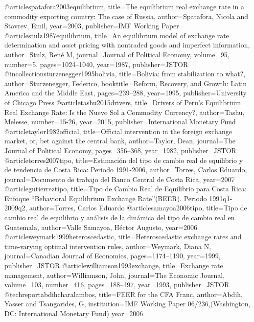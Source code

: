@article{spatafora2003equilibrium,
  title={The equilibrium real exchange rate in a commodity exporting country: The case of Russia},
  author={Spatafora, Nicola and Stavrev, Emil},
  year={2003},
  publisher={IMF Working Paper}
}
@article{stulz1987equilibrium,
  title={An equilibrium model of exchange rate determination and asset pricing with nontraded goods and imperfect information},
  author={Stulz, Ren{\'e} M},
  journal={Journal of Political Economy},
  volume={95},
  number={5},
  pages={1024--1040},
  year={1987},
  publisher={JSTOR}
}
@incollection{sturzenegger1995bolivia,
  title={Bolivia: from stabilization to what?},
  author={Sturzenegger, Federico},
  booktitle={Reform, Recovery, and Growth: Latin America and the Middle East},
  pages={239--288},
  year={1995},
  publisher={University of Chicago Press}
}
@article{tashu2015drivers,
  title={Drivers of Peru's Equilibrium Real Exchange Rate: Is the Nuevo Sol a Commodity Currency?},
  author={Tashu, Melesse},
  number={15-26},
  year={2015},
  publisher={International Monetary Fund}
}
@article{taylor1982official,
  title={Official intervention in the foreign exchange market, or, bet against the central bank},
  author={Taylor, Dean},
  journal={The Journal of Political Economy},
  pages={356--368},
  year={1982},
  publisher={JSTOR}
}
@article{torres2007tipo,
  title={Estimación del tipo de cambio real de equilibrio y de tendencia de Costa Rica: Periodo 1991-2006},
  author={Torres, Carlos Eduardo},
  journal={Documento de trabajo del Banco Central de Costa Rica},
  year={2007}
}
@article{gutierreztipo,
  title={Tipo de Cambio Real de Equilibrio para Costa Rica: Enfoque “Behavioral Equilibrium Exchange Rate”(BEER). Periodo 1991q1-2009q2},
  author={Torres, Carlos Eduardo}
}
@article{samayoa2006tipo,
  title={Tipo de cambio real de equilibrio y an{\'a}lisis de la din{\'a}mica del tipo de cambio real en Guatemala},
  author={Valle Samayoa, H{\'e}ctor Augusto},
  year={2006}
}
@article{weymark1999heteroscedastic,
  title={Heteroscedastic exchange rates and time-varying optimal intervention rules},
  author={Weymark, Diana N},
  journal={Canadian Journal of Economics},
  pages={1174--1190},
  year={1999},
  publisher={JSTOR}
}
@article{williamson1993exchange,
  title={Exchange rate management},
  author={Williamson, John},
  journal={The Economic Journal},
  volume={103},
  number={416},
  pages={188--197},
  year={1993},
  publisher={JSTOR}
}
@techreport{abdihcharalambos,	  
	title={FEER for the CFA Franc},	  
	author={Abdih, Yasser and Tsangarides, G},
	institution={IMF Working Paper 06/236,(Washington, DC: International Monetary Fund)}	
	year={2006}
}				
